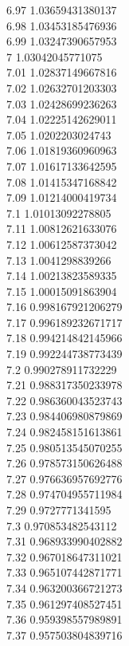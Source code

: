 {6.97	1.03659431380137\\
6.98	1.03453185476936\\
6.99	1.03247390657953\\
7	1.03042045771075\\
7.01	1.02837149667816\\
7.02	1.02632701203303\\
7.03	1.02428699236263\\
7.04	1.02225142629011\\
7.05	1.0202203024743\\
7.06	1.01819360960963\\
7.07	1.01617133642595\\
7.08	1.01415347168842\\
7.09	1.01214000419734\\
7.1	1.01013092278805\\
7.11	1.00812621633076\\
7.12	1.00612587373042\\
7.13	1.0041298839266\\
7.14	1.00213823589335\\
7.15	1.00015091863904\\
7.16	0.998167921206279\\
7.17	0.996189232671717\\
7.18	0.994214842145966\\
7.19	0.992244738773439\\
7.2	0.990278911732229\\
7.21	0.988317350233978\\
7.22	0.986360043523743\\
7.23	0.984406980879869\\
7.24	0.982458151613861\\
7.25	0.980513545070255\\
7.26	0.978573150626488\\
7.27	0.976636957692776\\
7.28	0.974704955711984\\
7.29	0.9727771341595\\
7.3	0.970853482543112\\
7.31	0.968933990402882\\
7.32	0.967018647311021\\
7.33	0.965107442871771\\
7.34	0.963200366721273\\
7.35	0.961297408527451\\
7.36	0.959398557989891\\
7.37	0.957503804839716\\
}
